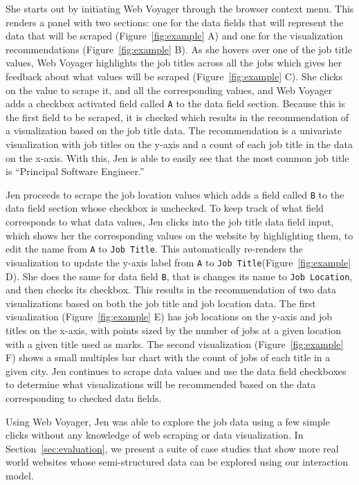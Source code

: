\documentclass[sigconf,screen]{acmart}
\begin{document}
She starts out by initiating Web Voyager through the browser context
menu. This renders a panel with two sections: one for the data fields
that will represent the data that will be scraped
(Figure~\ref{fig:example} A) and one for the visualization
recommendations (Figure~\ref{fig:example} B). As she hovers over one of
the job title values, Web Voyager highlights the job titles across all
the jobs which gives her feedback about what values will be scraped
(Figure~\ref{fig:example} C). She clicks on the value to scrape it, and
all the corresponding values, and Web Voyager adds a checkbox activated
field called \texttt{A} to the data field section. Because this is the
first field to be scraped, it is checked which results in the
recommendation of a visualization based on the job title data. The
recommendation is a univariate visualization with job titles on the
y-axis and a count of each job title in the data on the x-axis. With
this, Jen is able to easily see that the most common job title is
``Principal Software Engineer.''

Jen proceeds to scrape the job location values which adds a field called
\texttt{B} to the data field section whose checkbox is unchecked. To
keep track of what field corresponds to what data values, Jen clicks
into the job title data field input, which shows her the corresponding
values on the website by highlighting them, to edit the name from
\texttt{A} to \texttt{Job\ Title}. This automatically re-renders the
visualization to update the y-axis label from \texttt{A} to
\texttt{Job\ Title}(Figure~\ref{fig:example} D). She does the same for
data field \texttt{B}, that is changes its name to
\texttt{Job\ Location}, and then checks its checkbox. This results in
the recommendation of two data visualizations based on both the job
title and job location data. The first visualization
(Figure~\ref{fig:example} E) has job locations on the y-axis and job
titles on the x-axis, with points sized by the number of jobs at a given
location with a given title used as marks. The second visualization
(Figure~\ref{fig:example} F) shows a small multiples bar chart with the
count of jobs of each title in a given city. Jen continues to scrape
data values and use the data field checkboxes to determine what
visualizations will be recommended based on the data corresponding to
checked data fields.

Using Web Voyager, Jen was able to explore the job data using a few
simple clicks without any knowledge of web scraping or data
visualization. In Section~\ref{sec:evaluation}, we present a suite of
case studies that show more real world websites whose semi-structured
data can be explored using our interaction model.
\end{document}
